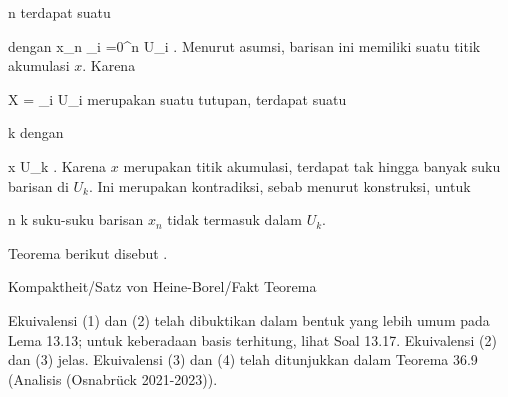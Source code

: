 {{\mavergleichskette
{\vergleichskette
{ n
}
{ \in }{ \N
}
{  }{
}
{    }{
}
{   }{
}
}
{}{}{}
terdapat suatu

 {dengan}
 {x_n \not\in \bigcup_{i =0}^n  U_i} {}
 {} {} {} {.}
Menurut asumsi, barisan ini memiliki suatu titik akumulasi $x$. Karena

\mavergleichskette
{\vergleichskette
{ X
}
{ = }{ \bigcup_{i \in \N} U_i
}
{  }{
}
{    }{
}
{   }{
}
}
{}{}{}
merupakan suatu tutupan, terdapat suatu

\mavergleichskette
{\vergleichskette
{ k
}
{ \in }{ \N
}
{  }{
}
{    }{
}
{   }{
}
}
{}{}{}
dengan

\mavergleichskette
{\vergleichskette
{ x
}
{ \in }{ U_k
}
{  }{
}
{    }{
}
{   }{
}
}
{}{}{.}
Karena $x$ merupakan titik akumulasi, terdapat tak hingga banyak suku barisan di $U_k$. Ini merupakan kontradiksi, sebab menurut konstruksi, untuk

\mavergleichskette
{\vergleichskette
{ n
}
{ \geq }{ k
}
{  }{
}
{    }{
}
{   }{
}
}
{}{}{}
suku-suku barisan $x_n$ tidak termasuk dalam $U_k$.}
{}

}

Teorema berikut disebut  {.}


{Kompaktheit/Satz von Heine-Borel/Fakt}
{Teorema}
{}
{

\faktzusatz {}
\faktzusatz {}

}
{

\teilbeweis {}{}{}
{Ekuivalensi (1) dan (2) telah dibuktikan dalam bentuk yang lebih umum pada
Lema 13.13;
untuk keberadaan basis terhitung, lihat
Soal 13.17.}
{}
\teilbeweis {}{}{}
{Ekuivalensi (2) dan (3) jelas.}
{}
\teilbeweis {}{}{}
{Ekuivalensi (3) dan (4) telah ditunjukkan dalam
Teorema 36.9 (Analisis (Osnabrück 2021-2023)).}
{}

}

